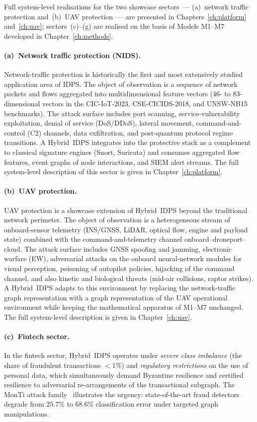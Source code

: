Full system-level realisations for the two showcase sectors~--- (a)~network traffic protection and~(b)~UAV protection~--- are presented in Chapters~\ref{ch:platform} and~\ref{ch:uav}; sectors~(c)--(g) are realised on the basis of Models M1--M7 developed in Chapter~\ref{ch:methods}.

\paragraph{(a)~Network traffic protection (NIDS).} Network-traffic protection is historically the first and most extensively studied application area of IDPS. The object of observation is a sequence of network packets and flows aggregated into multidimensional feature vectors (46- to 83-dimensional vectors in the CIC-IoT-2023, CSE-CICIDS-2018, and UNSW-NB15 benchmarks). The attack surface includes port scanning, service-vulnerability exploitation, denial of service (DoS/DDoS), lateral movement, command-and-control (C2) channels, data exfiltration, and post-quantum protocol regime transitions. A Hybrid~IDPS integrates into the protective stack as a complement to classical signature engines (Snort, Suricata) and consumes aggregated flow features, event graphs of node interactions, and SIEM alert streams. The full system-level description of this sector is given in Chapter~\ref{ch:platform}.

\paragraph{(b)~UAV protection.} UAV protection is a showcase extension of Hybrid~IDPS beyond the traditional network perimeter. The object of observation is a heterogeneous stream of onboard-sensor telemetry (INS/GNSS, LiDAR, optical flow, engine and payload state) combined with the command-and-telemetry channel onboard--droneport--cloud. The attack surface includes GNSS spoofing and jamming, electronic warfare (EW), adversarial attacks on the onboard neural-network modules for visual perception, poisoning of autopilot policies, hijacking of the command channel, and also kinetic and biological threats (mid-air collisions, raptor strikes). A Hybrid~IDPS adapts to this environment by replacing the network-traffic graph representation with a graph representation of the UAV operational environment while keeping the mathematical apparatus of M1--M7 unchanged. The full system-level description is given in Chapter~\ref{ch:uav}.

\paragraph{(c)~Fintech sector.} In the fintech sector, Hybrid~IDPS operates under \emph{severe class imbalance} (the share of fraudulent transactions $<\!1\%$) and \emph{regulatory restrictions} on the use of personal data, which simultaneously demand Byzantine resilience and certified resilience to adversarial re-arrangements of the transactional subgraph. The MonTi attack family~\cite{MonTi2025} illustrates the urgency: state-of-the-art fraud detectors degrade from 25.7\% to 68.6\% classification error under targeted graph manipulations.

